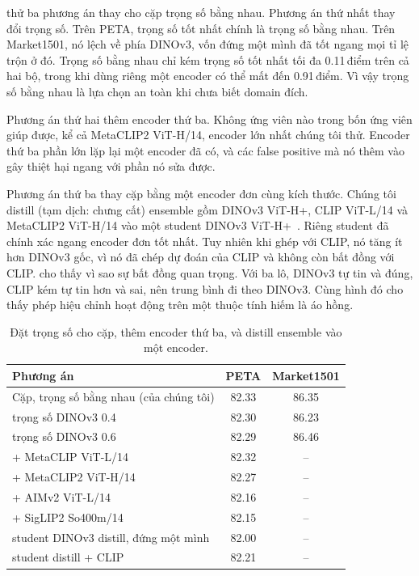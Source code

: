 \documentclass[10pt,twocolumn,letterpaper]{article}
\newcommand{\pts}{\,điểm}
\begin{document}
 thử ba phương án thay cho cặp trọng số bằng nhau. Phương án thứ nhất thay đổi trọng số. Trên PETA, trọng số tốt nhất chính là trọng số bằng nhau. Trên Market1501, nó lệch về phía DINOv3, vốn đứng một mình đã tốt ngang mọi tỉ lệ trộn ở đó. Trọng số bằng nhau chỉ kém trọng số tốt nhất tối đa 0.11\pts{} trên cả hai bộ, trong khi dùng riêng một encoder có thể mất đến 0.91\pts. Vì vậy trọng số bằng nhau là lựa chọn an toàn khi chưa biết domain đích.

Phương án thứ hai thêm encoder thứ ba. Không ứng viên nào trong bốn ứng viên giúp được, kể cả MetaCLIP2 ViT-H/14, encoder lớn nhất chúng tôi thử. Encoder thứ ba phần lớn lặp lại một encoder đã có, và các false positive mà nó thêm vào gây thiệt hại ngang với phần nó sửa được.

Phương án thứ ba thay cặp bằng một encoder đơn cùng kích thước. Chúng tôi distill (tạm dịch: chưng cất) ensemble gồm DINOv3 ViT-H+, CLIP ViT-L/14 và MetaCLIP2 ViT-H/14 vào một student DINOv3 ViT-H+~\cite{hinton}. Riêng student đã chính xác ngang encoder đơn tốt nhất. Tuy nhiên khi ghép với CLIP, nó tăng ít hơn DINOv3 gốc, vì nó đã chép dự đoán của CLIP và không còn bất đồng với CLIP.  cho thấy vì sao sự bất đồng quan trọng. Với ba lô, DINOv3 tự tin và đúng, CLIP kém tự tin hơn và sai, nên trung bình đi theo DINOv3. Cùng hình đó cho thấy phép hiệu chỉnh hoạt động trên một thuộc tính hiếm là áo hồng.

\begin{table}[t]
\centering\small
\setlength{\tabcolsep}{4pt}
\begin{tabular}{@{}lcc@{}}
\toprule
Phương án & PETA & Market1501 \\
\midrule
Cặp, trọng số bằng nhau (của chúng tôi) & 82.33 & 86.35 \\
\quad trọng số DINOv3 0.4 & 82.30 & 86.23 \\
\quad trọng số DINOv3 0.6 & 82.29 & 86.46 \\
\midrule
+ MetaCLIP ViT-L/14 & 82.32 & -- \\
+ MetaCLIP2 ViT-H/14 & 82.27 & -- \\
+ AIMv2 ViT-L/14 & 82.16 & -- \\
+ SigLIP2 So400m/14 & 82.15 & -- \\
\midrule
student DINOv3 distill, đứng một mình & 82.00 & -- \\
student distill + CLIP & 82.21 & -- \\
\bottomrule
\end{tabular}
\caption{Đặt trọng số cho cặp, thêm encoder thứ ba, và distill ensemble vào một encoder.}
\label{tab:design}
\end{table}
\end{document}
